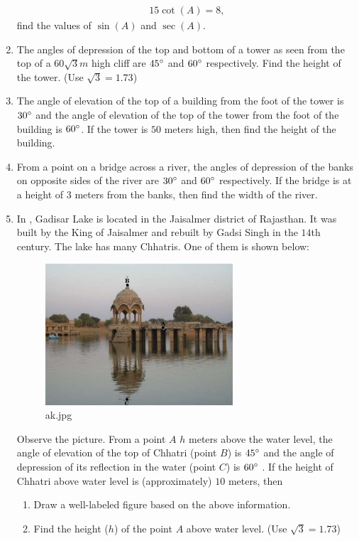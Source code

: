 \begin{enumerate}
\begin{align}
        15 \cot (A) = 8,
    \end{align}
    find the values of $\sin (A)$ and $\sec (A)$.
    \hfill{}\item The angles of depression of the top and bottom of a tower as seen from the top of a $60\sqrt{3}m$ high cliff are $45\degree$ and $60\degree$ respectively. Find the height of the tower. (Use $\sqrt{3}=1.73$)
    \hfill{}\item The angle of elevation of the top of a building from the foot of the tower is $30\degree$ and the angle of elevation of the top of the tower from the foot of the building is $60\degree$. If the tower is $50$ meters high, then find the height of the building.
    \hfill{}\item From a point on a bridge across a river, the angles of depression of the banks on opposite sides of the river are $30\degree$ and $60\degree$ respectively. If the bridge is at a height of $3$ meters from the banks, then find the width of the river. 
    \hfill{}\item In , Gadisar Lake is located in the Jaisalmer district of Rajasthan. It was built by the King of Jaisalmer and rebuilt by Gadsi Singh in the $14$th century. The lake has many Chhatris. One of them is shown below:
    \begin{figure}[H]
        \centering
    	 \includegraphics[width=70mm]{cbse-math/figs/ak.jpeg}
        \caption{ak.jpg}
        \label{fig:ak}
    \end{figure}
    Observe the picture. From a point $A$ $h$ meters above the water level, the angle of elevation of the top of Chhatri (point $B$) is $45\degree$ and the angle of depression of its reflection in the water (point $C$) is $60\degree$ . If the height of Chhatri above water level is (approximately) $10$ meters, then 
    \begin{enumerate}
        \hfill{}\item Draw a well-labeled figure based on the above information.
        \hfill{}\item Find the height ($h$) of the point $A$ above water level. (Use $\sqrt{3}=1.73$) 
    \end{enumerate}


\end{enumerate}
